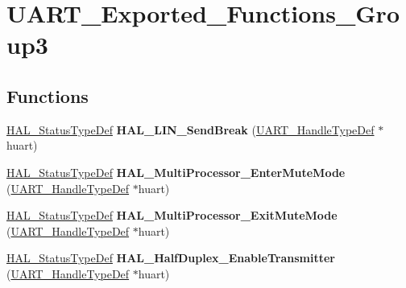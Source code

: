 \hypertarget{group___u_a_r_t___exported___functions___group3}{}\section{U\+A\+R\+T\+\_\+\+Exported\+\_\+\+Functions\+\_\+\+Group3}
\label{group___u_a_r_t___exported___functions___group3}
\subsection*{Functions}
\begin{DoxyCompactItemize}
\item 
\mbox{\label{group___u_a_r_t___exported___functions___group3_gaffbf11fb4929f709004a11675cd25fcf}} 
\mbox{\hyperlink{stm32f4xx__hal__def_8h_a63c0679d1cb8b8c684fbb0632743478f}{H\+A\+L\+\_\+\+Status\+Type\+Def}} {\bfseries H\+A\+L\+\_\+\+L\+I\+N\+\_\+\+Send\+Break} (\mbox{\hyperlink{struct_u_a_r_t___handle_type_def}{U\+A\+R\+T\+\_\+\+Handle\+Type\+Def}} $\ast$huart)
\item 
\mbox{\label{group___u_a_r_t___exported___functions___group3_ga659637545299b91d2a77dadaf7266bf2}} 
\mbox{\hyperlink{stm32f4xx__hal__def_8h_a63c0679d1cb8b8c684fbb0632743478f}{H\+A\+L\+\_\+\+Status\+Type\+Def}} {\bfseries H\+A\+L\+\_\+\+Multi\+Processor\+\_\+\+Enter\+Mute\+Mode} (\mbox{\hyperlink{struct_u_a_r_t___handle_type_def}{U\+A\+R\+T\+\_\+\+Handle\+Type\+Def}} $\ast$huart)
\item 
\mbox{\label{group___u_a_r_t___exported___functions___group3_ga81b90fb3a4d7a8601a92260edbd3422f}} 
\mbox{\hyperlink{stm32f4xx__hal__def_8h_a63c0679d1cb8b8c684fbb0632743478f}{H\+A\+L\+\_\+\+Status\+Type\+Def}} {\bfseries H\+A\+L\+\_\+\+Multi\+Processor\+\_\+\+Exit\+Mute\+Mode} (\mbox{\hyperlink{struct_u_a_r_t___handle_type_def}{U\+A\+R\+T\+\_\+\+Handle\+Type\+Def}} $\ast$huart)
\item 
\mbox{\label{group___u_a_r_t___exported___functions___group3_ga58d73e260a5536fb9cb40d7d2fe2b4bb}} 
\mbox{\hyperlink{stm32f4xx__hal__def_8h_a63c0679d1cb8b8c684fbb0632743478f}{H\+A\+L\+\_\+\+Status\+Type\+Def}} {\bfseries H\+A\+L\+\_\+\+Half\+Duplex\+\_\+\+Enable\+Transmitter} (\mbox{\hyperlink{struct_u_a_r_t___handle_type_def}{U\+A\+R\+T\+\_\+\+Handle\+Type\+Def}} $\ast$huart)

\end{DoxyCompactItemize}
